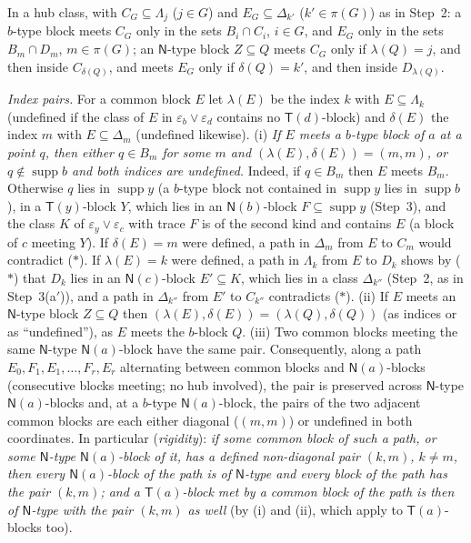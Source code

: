 \documentclass[11pt]{amsart}
\theoremstyle{definition}
\newcommand{\supp}{\operatorname{supp}}
\newcommand{\T}{\mathsf{T}}
\newcommand{\N}{\mathsf{N}}
\begin{document}
In a hub class, with $C_G\subseteq\Lambda_j$ ($j\in G$) and $E_G\subseteq\Delta_{k'}$ ($k'\in\pi(G)$) as in Step~2: a $b$-type block meets $C_G$ only in the sets $B_i\cap C_i$, $i\in G$, and $E_G$ only in the sets $B_m\cap D_m$, $m\in\pi(G)$; an $\N$-type block $Z\subseteq Q$ meets $C_G$ only if $\lambda(Q)=j$, and then inside $C_{\delta(Q)}$, and meets $E_G$ only if $\delta(Q)=k'$, and then inside $D_{\lambda(Q)}$.

\emph{Index pairs.} For a common block $E$ let $\lambda(E)$ be the index $k$ with $E\subseteq\Lambda_k$ (undefined if the class of $E$ in $\varepsilon_b\vee\varepsilon_d$ contains no $\T(d)$-block) and $\delta(E)$ the index $m$ with $E\subseteq\Delta_m$ (undefined likewise). (i) \emph{If $E$ meets a $b$-type block of $a$ at a point $q$, then either $q\in B_m$ for some $m$ and $(\lambda(E),\delta(E))=(m,m)$, or $q\notin\supp b$ and both indices are undefined.} Indeed, if $q\in B_m$ then $E$ meets $B_m$. Otherwise $q$ lies in $\supp y$ (a $b$-type block not contained in $\supp y$ lies in $\supp b$), in a $\T(y)$-block $Y$, which lies in an $\N(b)$-block $F\subseteq\supp y$ (Step~3), and the class $K$ of $\varepsilon_y\vee\varepsilon_c$ with trace $F$ is of the second kind and contains $E$ (a block of $c$ meeting $Y$). If $\delta(E)=m$ were defined, a path in $\Delta_m$ from $E$ to $C_m$ would contradict ($*$). If $\lambda(E)=k$ were defined, a path in $\Lambda_k$ from $E$ to $D_k$ shows by ($*$) that $D_k$ lies in an $\N(c)$-block $E'\subseteq K$, which lies in a class $\Delta_{k''}$ (Step~2, as in Step~3(a$'$)), and a path in $\Delta_{k''}$ from $E'$ to $C_{k''}$ contradicts ($*$). (ii) If $E$ meets an $\N$-type block $Z\subseteq Q$ then $(\lambda(E),\delta(E))=(\lambda(Q),\delta(Q))$ (as indices or as ``undefined''), as $E$ meets the $b$-block $Q$. (iii) Two common blocks meeting the same $\N$-type $\N(a)$-block have the same pair. Consequently, along a path $E_0,F_1,E_1,\dots,F_r,E_r$ alternating between common blocks and $\N(a)$-blocks (consecutive blocks meeting; no hub involved), the pair is preserved across $\N$-type $\N(a)$-blocks and, at a $b$-type $\N(a)$-block, the pairs of the two adjacent common blocks are each either diagonal ($(m,m)$) or undefined in both coordinates. In particular (\emph{rigidity}): \emph{if some common block of such a path, or some $\N$-type $\N(a)$-block of it, has a defined non-diagonal pair $(k,m)$, $k\ne m$, then every $\N(a)$-block of the path is of $\N$-type and every block of the path has the pair $(k,m)$; and a $\T(a)$-block met by a common block of the path is then of $\N$-type with the pair $(k,m)$ as well} (by (i) and (ii), which apply to $\T(a)$-blocks too).
\end{document}
